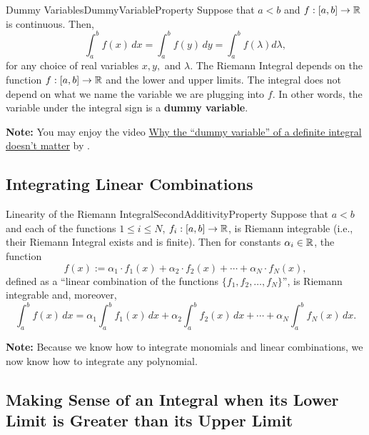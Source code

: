 \begin{propColor}{Dummy Variables}{DummyVariableProperty} Suppose that $a < b$ and $f:[a, b] \to \mathbb R$ is continuous. Then,
\begin{equation}
\label{eq:DummyVariableOfIntegration}
    \int_{a}^{b} f(x)\, dx =\int_{a}^{b} f(y) \, dy = \int_{a}^{b} f(\lambda) d\lambda,
\end{equation}
for any choice of real variables $x, y,$ and $\lambda$. The Riemann Integral depends on the function $f:[a, b] \to \mathbb R$ and the lower and upper limits. The integral does not depend on what we name the variable we are plugging into $f$. In other words, the variable under the integral sign is a \textbf{dummy variable}. 
    
\end{propColor}

\textbf{Note:} You may enjoy the video \href{https://youtu.be/PeXyrknSXfU}{Why the ``dummy variable'' of a definite integral doesn't matter} by \bprp. 



\subsection{Integrating Linear Combinations}

\begin{propColor}{Linearity of the Riemann Integral}{SecondAdditivityProperty}
Suppose that $a < b$ and each of the functions $1 \le i \le N$, $f_i:[a, b] \to \mathbb R$, is Riemann integrable (i.e., their Riemann Integral exists and is finite). Then for constants $\alpha_i \in \mathbb R$, the function
$$ f(x):= \alpha_1 \cdot f_1(x) + \alpha_2 \cdot f_2(x) + \cdots + \alpha_N \cdot f_N(x),$$
defined as a ``linear combination of the functions $\{ f_1, f_2, \ldots, f_N\}$'', is Riemann integrable and, moreover, 
\begin{equation}
    \int_a^b f(x)\, dx = \alpha_1 \int_a^b   f_1(x)\, dx + \alpha_2 \int_a^b  f_2(x)\, dx + \cdots + \alpha_N  \int_a^b f_N(x)\, dx.
\end{equation}
\bigskip

\textbf{Note:} Because we know how to integrate monomials and linear combinations, we now know how to integrate any polynomial.

\end{propColor}

\subsection{Making Sense of an Integral when its Lower Limit is Greater than its Upper Limit}

